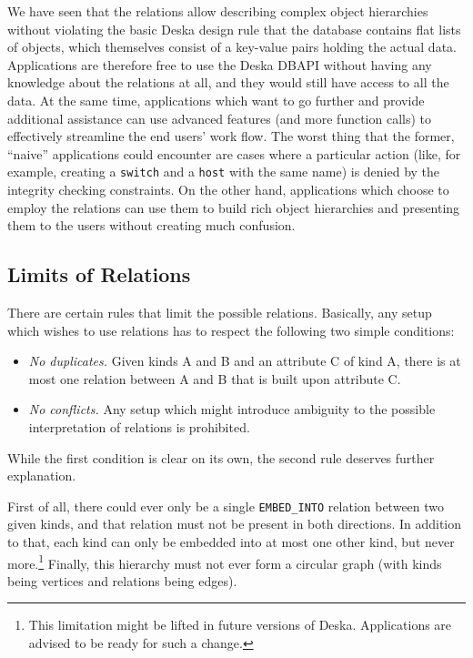 \documentclass[deska]{subfiles}
\begin{document}
We have seen that the relations allow describing complex object hierarchies without violating the basic Deska design
rule that the database contains flat lists of objects, which themselves consist of a key-value pairs holding the actual
data.  Applications are therefore free to use the Deska DBAPI without having any knowledge about the relations at all,
and they would still have access to all the data.  At the same time, applications which want to go further and provide
additional assistance can use advanced features (and more function calls) to effectively streamline the end users' work
flow.  The worst thing that the former, ``naive'' applications could encounter are cases where a particular action
(like, for example, creating a {\tt switch} and a {\tt host} with the same name) is denied by the integrity checking
constraints.  On the other hand, applications which choose to employ the relations can use them to build rich object
hierarchies and presenting them to the users without creating much confusion.

\subsection{Limits of Relations}

There are certain rules that limit the possible relations.  Basically, any setup which wishes to use relations has to
respect the following two simple conditions:

\begin{itemize}
    \item {\em No duplicates.} Given kinds A and B and an attribute C of kind A, there is at most one relation between A
        and B that is built upon attribute C.
    \item {\em No conflicts.} Any setup which might introduce ambiguity to the possible interpretation of relations is
        prohibited.
\end{itemize}

While the first condition is clear on its own, the second rule deserves further explanation.

First of all, there could ever only be a single {\tt EMBED\_INTO} relation between two given kinds, and that relation
must not be present in both directions.  In addition to that, each kind can only be embedded into at most one other
kind, but never more.\footnote{This limitation might be lifted in future versions of Deska.  Applications are advised to
be ready for such a change.}  Finally, this hierarchy must not ever form a circular graph (with kinds being vertices and
relations being edges).
\end{document}
